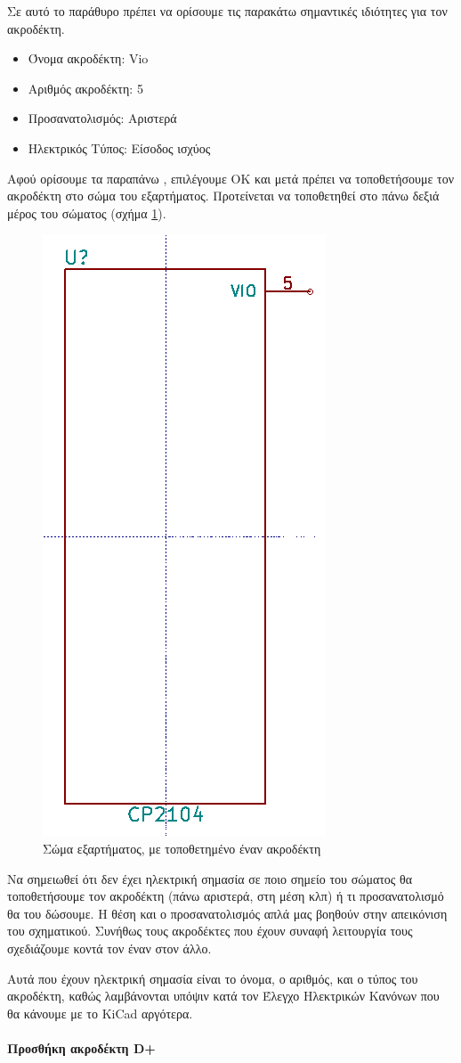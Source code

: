 \documentclass[a4paper]{article}
\begin{document}
Σε αυτό το παράθυρο πρέπει να ορίσουμε τις παρακάτω σημαντικές ιδιότητες για τον ακροδέκτη.

\begin{itemize}
    \item Όνομα ακροδέκτη: Vio
    \item Αριθμός ακροδέκτη: 5
    \item Προσανατολισμός: Αριστερά
    \item Ηλεκτρικός Τύπος: Είσοδος ισχύος
\end{itemize}

Αφού ορίσουμε τα παραπάνω , επιλέγουμε ΟΚ και μετά πρέπει να τοποθετήσουμε τον ακροδέκτη στο σώμα του εξαρτήματος. Προτείνεται να τοποθετηθεί στο πάνω δεξιά μέρος του σώματος (σχήμα \ref{fig:libed-circ-vioplaced}).

\begin{figure}
  \begin{center}
    \includegraphics[width=.2\textwidth]{img/libed-circ-vioplaced.png}
    \caption{Σώμα εξαρτήματος, με τοποθετημένο έναν ακροδέκτη}
    \label{fig:libed-circ-vioplaced}
  \end{center}
\end{figure}

Να σημειωθεί ότι δεν έχει ηλεκτρική σημασία σε ποιο σημείο του σώματος θα τοποθετήσουμε τον ακροδέκτη (πάνω αριστερά, στη μέση κλπ) ή τι προσανατολισμό θα του δώσουμε. Η θέση και ο προσανατολισμός απλά μας βοηθούν στην απεικόνιση του σχηματικού. Συνήθως τους ακροδέκτες που έχουν συναφή λειτουργία τους σχεδιάζουμε κοντά τον έναν στον άλλο.

Αυτά που έχουν ηλεκτρική σημασία είναι το όνομα, ο αριθμός, και ο τύπος του ακροδέκτη, καθώς λαμβάνονται υπόψιν κατά τον Έλεγχο Ηλεκτρικών Κανόνων που θα κάνουμε με το \textenglish{KiCad} αργότερα.

\paragraph{Προσθήκη ακροδέκτη D+}
\end{document}
